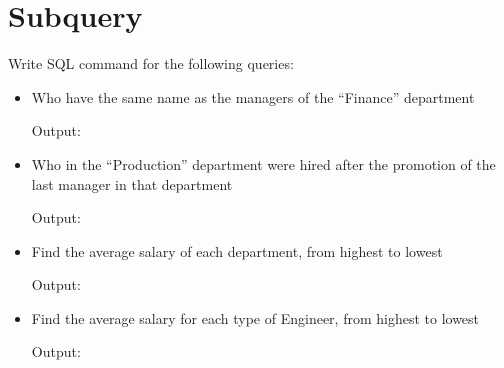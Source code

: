 \documentclass{assignment}
\begin{document}
\section*{Subquery}
Write SQL command for the following queries:
\begin{itemize}[noitemsep]
    \item Who have the same name as the managers of the ``Finance'' department
        
        Output:
        
    \item Who in the ``Production'' department were hired after the
        promotion of the last manager in that department
        
        Output:
        
        \newpage
    \item Find the average salary of each department, from highest to lowest
        
        Output:
        
    \item Find the average salary for each type of Engineer, from
        highest to lowest
        
        \newpage
        Output:
        
\end{itemize}
\end{document}
